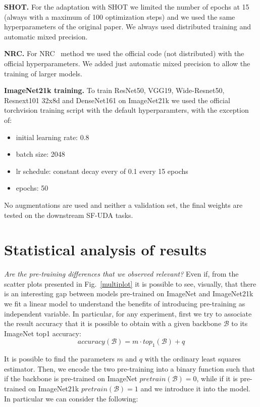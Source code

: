 \documentclass{article}
\begin{document}
\textbf{SHOT.} For the adaptation with SHOT we limited the number of epochs at 15 (always with a maximum of 100 optimization steps) and we used the same hyperparameters of the original paper. We always used distributed training and automatic mixed precision.

\textbf{NRC.} For NRC~\citep{yang2021exploiting} method we used the official code (not distributed) with the official hyperparameters. We added just automatic mixed precision to allow the training of larger models.

\textbf{ImageNet21k training.} To train ResNet50, VGG19, Wide-Resnet50, Resnext101 32x8d and DenseNet161 on ImageNet21k we used the official torchvision training script with the default hyperparamters, with the exception of:
\begin{itemize}
    \item initial learning rate: 0.8
    \item batch size: 2048
    \item lr schedule: constant decay every of 0.1 every 15 epochs
    \item epochs: 50 
\end{itemize}
No augmentations are used and neither a validation set, the final weights are tested on the downstream SF-UDA tasks.
\clearpage




\section{Statistical analysis of results}
\label{statanalysis}
\textit{Are the pre-training differences that we observed relevant?} Even if, from the scatter plots presented in Fig.~\ref{multiplot} it is possible to see, visually, that there is an interesting gap between models pre-trained on ImageNet and ImageNet21k we fit a linear model to understand the benefits of introducing pre-training as independent variable.
In particular, for any experiment, first we try to associate the result accuracy that it is possible to obtain with a given backbone $\mathcal{B}$ to its ImageNet top1 accuracy:
\begin{equation}
    accuracy(\mathcal{B}) = m \cdot top_1(\mathcal{B}) + q
\end{equation}

It is possible to find the parameters $m$ and $q$ with the ordinary least squares estimator. 
Then, we encode the two pre-training into a binary function such that if the backbone is pre-trained on ImageNet $pretrain(\mathcal{B}) = 0$, while if it is pre-trained on ImageNet21k $pretrain(\mathcal{B}) = 1$ and we introduce it into the model. In particular we can consider the following:
\end{document}
